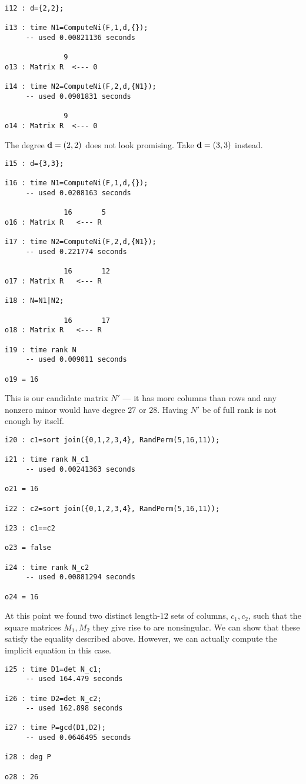 \documentclass[fleqn,reqno]{amsart}
\begin{document}
\begin{example}[$\mt{ex604}$]
\begin{verbatim}
i12 : d={2,2};

i13 : time N1=ComputeNi(F,1,d,{});
     -- used 0.00821136 seconds

              9
o13 : Matrix R  <--- 0

i14 : time N2=ComputeNi(F,2,d,{N1});
     -- used 0.0901831 seconds

              9
o14 : Matrix R  <--- 0
\end{verbatim}
The degree $\mathbf d=(2,2)$ does not look promising.
Take $\mathbf d=(3,3)$ instead.
\begin{verbatim}
i15 : d={3,3};

i16 : time N1=ComputeNi(F,1,d,{});
     -- used 0.0208163 seconds

              16       5
o16 : Matrix R   <--- R

i17 : time N2=ComputeNi(F,2,d,{N1});
     -- used 0.221774 seconds

              16       12
o17 : Matrix R   <--- R

i18 : N=N1|N2;

              16       17
o18 : Matrix R   <--- R

i19 : time rank N
     -- used 0.009011 seconds

o19 = 16
\end{verbatim}
This is our candidate matrix $N'$ --- it has more columns than rows and any
nonzero minor would have degree $27$ or $28$.
Having $N'$ be of full rank is not enough by itself.
\begin{verbatim}
i20 : c1=sort join({0,1,2,3,4}, RandPerm(5,16,11));

i21 : time rank N_c1
     -- used 0.00241363 seconds

o21 = 16

i22 : c2=sort join({0,1,2,3,4}, RandPerm(5,16,11));

i23 : c1==c2

o23 = false

i24 : time rank N_c2
     -- used 0.00881294 seconds

o24 = 16
\end{verbatim}
At this point we found two distinct length-$12$ sets of columns, $c_1,c_2$,
such that the square matrices $M_1,M_2$ they give rise to are nonsingular.
We can show that these satisfy the equality described above.
However, we can actually compute the implicit equation in this case.
\begin{verbatim}
i25 : time D1=det N_c1;
     -- used 164.479 seconds

i26 : time D2=det N_c2;
     -- used 162.898 seconds

i27 : time P=gcd(D1,D2);
     -- used 0.0646495 seconds

i28 : deg P

o28 : 26
\end{verbatim}
\end{example}
\end{document}
